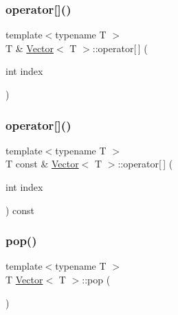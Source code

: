 \mbox{\label{classVector_a2054758707c08325ef160fd4dfc48ff7}} 
\subsubsection{\texorpdfstring{operator[]()}{operator[]()}\hspace{0.1cm}{\footnotesize\ttfamily [1/2]}}
{\footnotesize\ttfamily template$<$typename T $>$ \\
T \& \hyperlink{classVector}{Vector}$<$ T $>$\+::operator\mbox{[}$\,$\mbox{]} (\begin{DoxyParamCaption}\item[{int}]{index }\end{DoxyParamCaption})}

\mbox{\label{classVector_a491327d90df15af7ee79c6705f005491}} 
\subsubsection{\texorpdfstring{operator[]()}{operator[]()}\hspace{0.1cm}{\footnotesize\ttfamily [2/2]}}
{\footnotesize\ttfamily template$<$typename T $>$ \\
T const  \& \hyperlink{classVector}{Vector}$<$ T $>$\+::operator\mbox{[}$\,$\mbox{]} (\begin{DoxyParamCaption}\item[{int}]{index }\end{DoxyParamCaption}) const}

\mbox{\label{classVector_aef4a3e10a9844ea17cdd89cee17e495a}} 
\subsubsection{\texorpdfstring{pop()}{pop()}}
{\footnotesize\ttfamily template$<$typename T $>$ \\
T \hyperlink{classVector}{Vector}$<$ T $>$\+::pop (\begin{DoxyParamCaption}{ }\end{DoxyParamCaption})}

